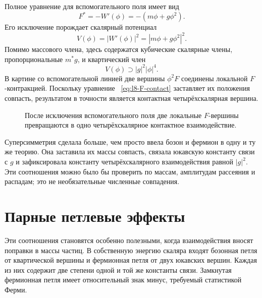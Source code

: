 Полное уравнение для вспомогательного поля имеет вид
\begin{equation}
F^\ast=-W'(\phi)=-(m\phi+g\phi^2).
\label{eq:l8-general-F-equation}
\end{equation}
Его исключение порождает скалярный потенциал
\begin{equation}
V(\phi)=|W'(\phi)|^2
=|m\phi+g\phi^2|^2.
\label{eq:l8-scalar-potential}
\end{equation}
Помимо массового члена, здесь содержатся кубические скалярные члены, пропорциональные \(m^\ast g\), и квартический член
\begin{equation}
V(\phi)\supset |g|^2|\phi|^4.
\label{eq:l8-quartic}
\end{equation}
В картине со вспомогательной линией две вершины \(\phi^2F\) соединены локальной \(F\)-контракцией. Поскольку уравнение ~\eqref{eq:l8-F-contact} заставляет их положения совпасть, результатом в точности является контактная четырёхскалярная вершина.

\begin{figure}[H]
\centering
{}
\caption{После исключения вспомогательного поля две локальные \(F\)-вершины превращаются в одно четырёхскалярное контактное взаимодействие.}
\end{figure}

Суперсимметрия сделала больше, чем просто ввела бозон и фермион в одну и ту же теорию. Она заставила их массы совпасть, связала юкавскую константу связи с \(g\) и зафиксировала константу четырёхскалярного взаимодействия равной \(|g|^2\). Эти соотношения можно было бы проверить по массам, амплитудам рассеяния и распадам; это не необязательные численные совпадения.

\section{Парные петлевые эффекты}

Эти соотношения становятся особенно полезными, когда взаимодействия вносят поправки в массы частиц. В собственную энергию скаляра входят бозонная петля от квартической вершины и фермионная петля от двух юкавских вершин. Каждая из них содержит две степени одной и той же константы связи. Замкнутая фермионная петля имеет относительный знак минус, требуемый статистикой Ферми.

